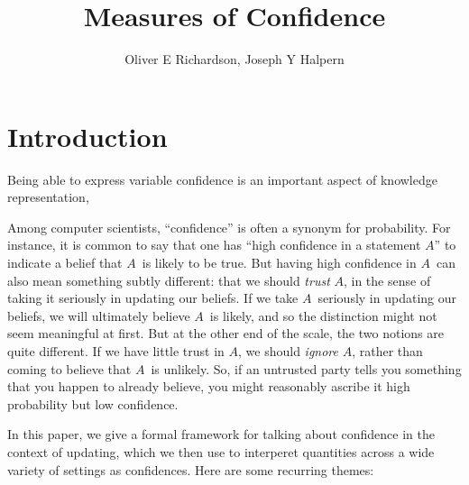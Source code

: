 \documentclass{article}
\title{Measures of Confidence}
\author{Oliver E Richardson, Joseph Y Halpern}
\begin{document}
    \maketitle

\section{Introduction}
\def\stmt{$A$}

Being able to express variable confidence is an important aspect of knowledge representation,

%
Among computer scientists, ``confidence'' is often a synonym for probability.
For instance, it is common to say that one has ``high confidence in a statement \stmt'' to indicate a belief that
\stmt\ is likely to be true.
But
having high confidence in \stmt\ can also mean something subtly different: that we should \emph{trust} \stmt, in the sense of taking it seriously in updating our beliefs.
If we take \stmt\ seriously in updating our beliefs, we will ultimately believe \stmt\ is likely, and so the distinction might not seem meaningful at first.
But at the other end of the scale, the two notions are quite different.
If we have little trust in \stmt, we should \emph{ignore} \stmt, rather than coming to believe that \stmt\ is unlikely.
So, if an untrusted party tells you something that you happen to already believe, you might reasonably ascribe it high probability but low confidence.

In this paper, we give a formal framework for talking about confidence in the context of updating,
which we then use to interperet quantities across a wide variety of settings as confidences.
Here are some recurring themes:
\end{document}
